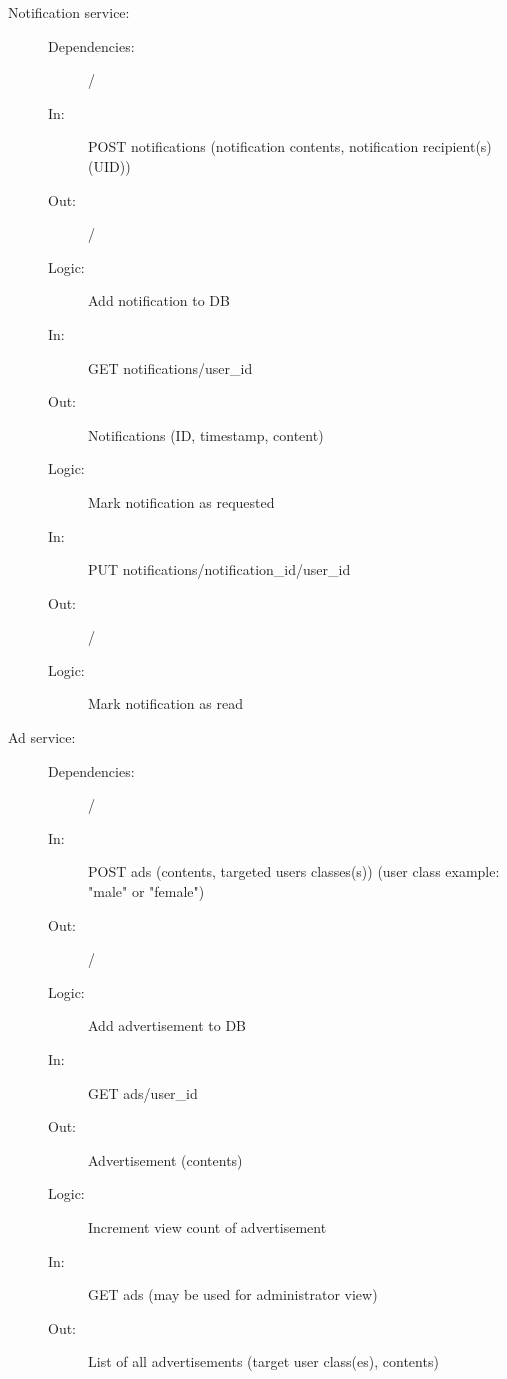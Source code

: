 \documentclass{article}
\begin{document}
\begin{description}
    \item [Notification service:]
    \begin{description}
        \item[]
        \item[Dependencies:] /
    \end{description}
    \begin{description}
        \item[]
        \item[In:] POST notifications (notification contents, notification recipient(s) (UID))
        \item[Out:] /
        \item[Logic:] Add notification to DB
        \item[]
        
        \item[In:] GET notifications/user\_id 
        \item[Out:] Notifications (ID, timestamp, content)
        \item[Logic:] Mark notification as requested
        \item[]
        
        \item[In:] PUT notifications/notification\_id/user\_id
        \item[Out:] /
        \item[Logic: ] Mark notification as read
    \end{description}
\end{description}

\begin{description}
    \item [Ad service:]
    \begin{description}
        \item[]
        \item[Dependencies:] /
    \end{description}
    \begin{description}
        \item[]
        \item[In:] POST ads (contents, targeted users classes(s)) (user class example: "male" or "female")
        \item[Out:] /
        \item[Logic:] Add advertisement to DB
        \item[]
        
        \item[In:] GET ads/user\_id
        \item[Out:] Advertisement (contents)
        \item[Logic:] Increment view count of advertisement
        \item[]
        
		\item[In:] GET ads (may be used for administrator view)
        \item[Out:] List of all advertisements (target user class(es), contents)
    \end{description}
\end{description}
\end{document}
